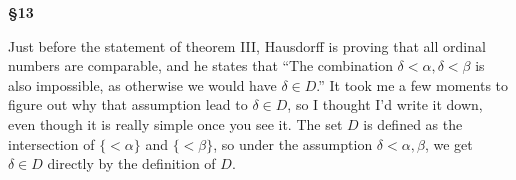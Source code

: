 \documentclass[11pt]{amsart}
\begin{document}
{\bf \S 13}

Just before the statement of theorem III, Hausdorff is proving that all ordinal numbers are comparable,
and he states that ``The combination $\delta < \alpha, \delta < \beta$ is
also impossible, as otherwise we would have $\delta \in D$.''
It took me a few moments to figure out why that assumption lead to
$\delta\in D$, so I thought I'd write it down, even though it is really simple
once you see it. The set $D$ is defined as the intersection of $\{<\alpha\}$
and $\{<\beta\}$, so under the assumption $\delta < \alpha, \beta$, we
get $\delta\in D$ directly by the definition of $D$.
\end{document}
